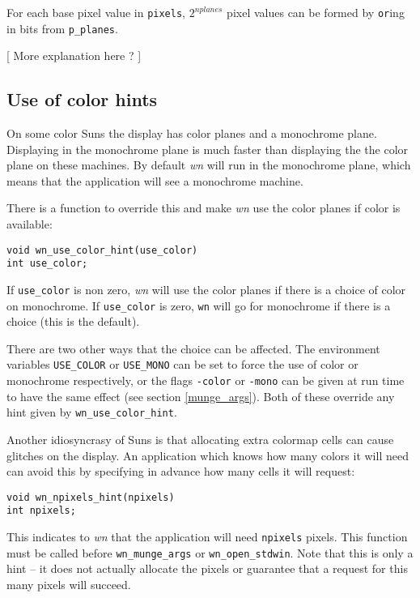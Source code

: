 For each base pixel value in {\tt pixels}, $2^{nplanes}$ pixel values
can be formed by {\tt or}ing in bits from {\tt *p\_planes}.

[ More explanation here ? ]
\subsection{Use of color hints}
On some color Suns the display has color planes and
a monochrome plane.  Displaying in the monochrome plane is much faster
than displaying the the color plane on these machines.
By default {\em wn} will run in the monochrome plane, which means
that the application will see a monochrome machine.

There is a function to override this and make {\em wn} use the color
planes if color is available:
\begin{verbatim}
void wn_use_color_hint(use_color)
int use_color;
\end{verbatim}
If {\tt use\_color} is non zero, {\em wn} will use the color planes if
there is a choice of color on monochrome.  If {\tt use\_color} is zero,
{\tt wn} will go for monochrome if there is a choice (this is the default).

There are two other ways that the choice can be affected.
The environment variables {\tt USE\_COLOR} or {\tt USE\_MONO} can be set
to force the use of color or monochrome respectively, or the flags
{\tt -color} or {\tt -mono} can be given at run time to have the same effect
(see section \ref{munge_args}).
Both of these override any hint given by {\tt wn\_use\_color\_hint}.

Another idiosyncrasy of Suns is that allocating extra colormap cells can
cause glitches on the display.  An application which knows how many
colors it will need can avoid this by specifying in advance how many
cells it will request:
\begin{verbatim}
void wn_npixels_hint(npixels)
int npixels;
\end{verbatim}
This indicates to {\em wn} that the application will need {\tt npixels}
pixels.
This function must be called before {\tt wn\_munge\_args} or
{\tt wn\_open\_stdwin}.
Note that this is only a hint -- it does not actually allocate the pixels
or guarantee that a request for this many pixels will succeed.
